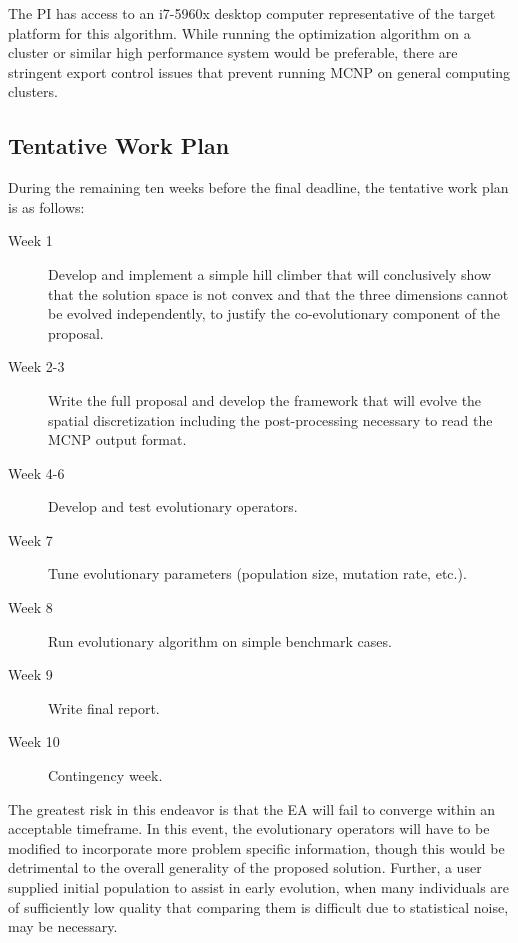 \documentclass{article}
\begin{document}
The PI has access to an i7-5960x desktop computer representative of the target platform for this algorithm. While running the optimization algorithm on a cluster or similar high performance system would be preferable, there are stringent export control issues that prevent running MCNP on general computing clusters. 

\subsection{Tentative Work Plan}\label{sec:b5}
During the remaining ten weeks before the final deadline, the tentative work plan is as follows:

\begin{description}
\item[Week 1] Develop and implement a simple hill climber that will conclusively show that the solution space is not convex and that the three dimensions cannot be evolved independently, to justify the co-evolutionary component of the proposal.

\item[Week 2-3] Write the full proposal and develop the framework that will evolve the spatial discretization including the post-processing necessary to read the MCNP output format.

\item [Week 4-6] Develop and test evolutionary operators.

\item [Week 7] Tune evolutionary parameters (population size, mutation rate, etc.).

\item [Week 8] Run evolutionary algorithm on simple benchmark cases.

\item [Week 9] Write final report.

\item [Week 10] Contingency week.
\end{description}

The greatest risk in this endeavor is that the EA will fail to converge within an acceptable timeframe. In this event, the evolutionary operators will have to be modified to incorporate more problem specific information, though this would be detrimental to the overall generality of the proposed solution. Further, a user supplied initial population to assist in early evolution, when many individuals are of sufficiently low quality that comparing them is difficult due to statistical noise, may be necessary.
\end{document}
